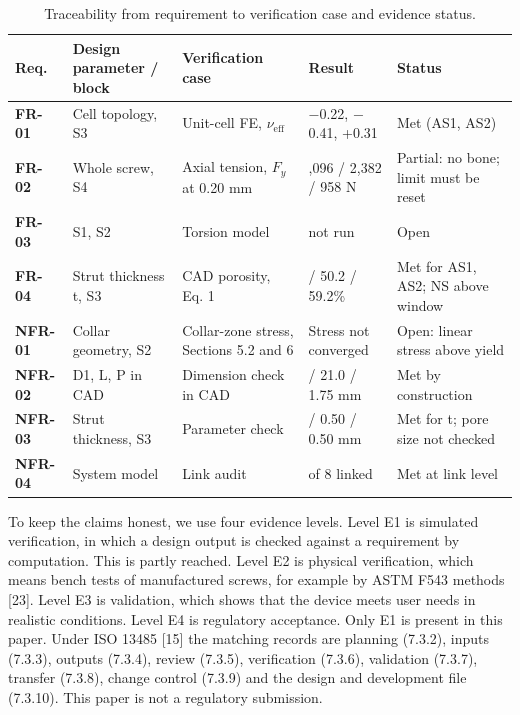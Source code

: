 \documentclass[10pt,twocolumn,letterpaper]{article}
\begin{document}
\begin{table}[!t]
\caption{Traceability from requirement to verification case and evidence status.}
\centering\fontsize{8}{9.6}\selectfont
\begin{tabular}{>{\raggedright\arraybackslash}p{}>{\centering\arraybackslash}p{}>{\raggedright\arraybackslash}p{}>{\centering\arraybackslash}p{}>{\raggedright\arraybackslash}p{}}
\toprule
\textbf{Req.} & \textbf{Design parameter / block} & \textbf{Verification case} & \textbf{Result} & \textbf{Status} \\
\midrule
\textbf{FR-01} & Cell topology, S3 & Unit-cell FE, $\nu_{\mathrm{eff}}$ & $-$0.22, $-$0.41, +0.31 & Met (AS1, AS2) \\
\textbf{FR-02} & Whole screw, S4 & Axial tension, $F_{y}$ at 0.20 mm & 3,096 / 2,382 / 958 N & Partial: no bone; limit must be reset \\
\textbf{FR-03} & S1, S2 & Torsion model & not run & Open \\
\textbf{FR-04} & Strut thickness t, S3 & CAD porosity, Eq. 1 & 52.4 / 50.2 / 59.2\% & Met for AS1, AS2; NS above window \\
\textbf{NFR-01} & Collar geometry, S2 & Collar-zone stress, Sections 5.2 and 6 & Stress not converged & Open: linear stress above yield \\
\textbf{NFR-02} & D1, L, P in CAD & Dimension check in CAD & 5.70 / 21.0 / 1.75 mm & Met by construction \\
\textbf{NFR-03} & Strut thickness, S3 & Parameter check & 0.50 / 0.50 / 0.50 mm & Met for t; pore size not checked \\
\textbf{NFR-04} & System model & Link audit & 8 of 8 linked & Met at link level \\
\bottomrule
\end{tabular}
\par{}
\end{table}
To keep the claims honest, we use four evidence levels. Level E1 is simulated verification, in which a design output is checked against a requirement by computation. This is partly reached. Level E2 is physical verification, which means bench tests of manufactured screws, for example by ASTM F543 methods [23]. Level E3 is validation, which shows that the device meets user needs in realistic conditions. Level E4 is regulatory acceptance. Only E1 is present in this paper. Under ISO 13485 [15] the matching records are planning (7.3.2), inputs (7.3.3), outputs (7.3.4), review (7.3.5), verification (7.3.6), validation (7.3.7), transfer (7.3.8), change control (7.3.9) and the design and development file (7.3.10). This paper is not a regulatory submission.
\end{document}
